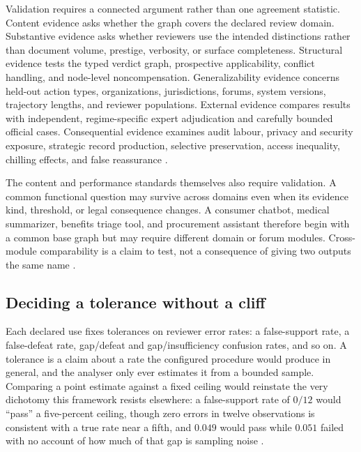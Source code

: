 Validation requires a connected argument rather than one agreement statistic. Content evidence asks whether the graph covers the declared review domain. Substantive evidence asks whether reviewers use the intended distinctions rather than document volume, prestige, verbosity, or surface completeness. Structural evidence tests the typed verdict graph, prospective applicability, conflict handling, and node-level noncompensation. Generalizability evidence concerns held-out action types, organizations, jurisdictions, forums, system versions, trajectory lengths, and reviewer populations. External evidence compares results with independent, regime-specific expert adjudication and carefully bounded official cases. Consequential evidence examines audit labour, privacy and security exposure, strategic record production, selective preservation, access inequality, chilling effects, and false reassurance \citep{messick1995Validity}.

The content and performance standards themselves also require validation. A common functional question may survive across domains even when its evidence kind, threshold, or legal consequence changes. A consumer chatbot, medical summarizer, benefits triage tool, and procurement assistant therefore begin with a common base graph but may require different domain or forum modules. Cross-module comparability is a claim to test, not a consequence of giving two outputs the same name \citep{messick1995validityStandards}.

\subsection{Deciding a tolerance without a cliff}

Each declared use fixes tolerances on reviewer error rates: a false-support rate, a false-defeat rate, gap/defeat and gap/insufficiency confusion rates, and so on. A tolerance is a claim about a rate the configured procedure would produce in general, and the analyser only ever estimates it from a bounded sample. Comparing a point estimate against a fixed ceiling would reinstate the very dichotomy this framework resists elsewhere: a false-support rate of \(0/12\) would \enquote{pass} a five-percent ceiling, though zero errors in twelve observations is consistent with a true rate near a fifth, and \(0.049\) would pass while \(0.051\) failed with no account of how much of that gap is sampling noise \citep{gelmanStern2006difference}.

